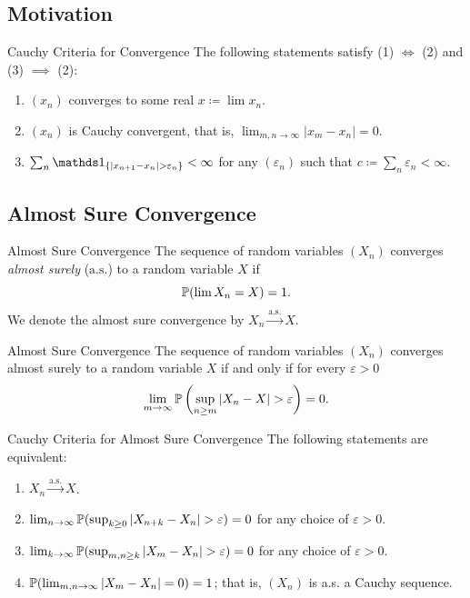 \subsection{Motivation}
\begin{prop}{Cauchy Criteria for Convergence}{}
	The following statements satisfy (1) \(\iff\) (2) and (3) \(\implies\) (2):
	\begin{enumerate}
		\item \((x_n)\) converges to some real \(x \coloneqq \lim x_n\).
		\item \((x_n)\) is Cauchy convergent, that is, \(\lim_{m,n \to \infty} |x_m - x_n| = 0\).
		\item \(\sum_n \I_{\{|x_{n+1} - x_n| > \varepsilon_n\}} < \infty\) for any \((\varepsilon_n)\) such that \(c \coloneqq \sum_n \varepsilon_n < \infty\).
	\end{enumerate}
\end{prop}

\subsection{Almost Sure Convergence}

\begin{defn}{Almost Sure Convergence}{}
	The sequence of random variables \((X_n)\) converges \textit{almost surely} (\(\text{a.s.}\)) to a random variable \(X\) if
	\begin{equation*}
		\mathbb{P}(\lim X_n = X) = 1.
	\end{equation*}
	We denote the almost sure convergence by \(X_n \xrightarrow{\text{a.s.}} X\).
\end{defn}

\begin{thm}{Almost Sure Convergence}{}
	The sequence of random variables \((X_n)\) converges almost surely to a random variable \(X\) if and only if for every \(\varepsilon > 0\)
	\begin{equation}
		\lim_{m \to \infty} \mathbb{P} \left( \sup_{n \ge m} |X_n - X| > \varepsilon \right) = 0.
		\label{eq:AlmostSureConvergenceCriteria}
	\end{equation}
\end{thm}

\begin{prop}{Cauchy Criteria for Almost Sure Convergence}{}
	The following statements are equivalent:
	\begin{enumerate}
		\item \(X_n \xrightarrow{\text{a.s.}} X\).
		\item \(\lim_{n \to \infty} \mathbb{P}(\sup_{k \ge 0} |X_{n+k} - X_n| > \varepsilon) = 0\) for any choice of \(\varepsilon > 0\).
		\item \(\lim_{k \to \infty} \mathbb{P}(\sup_{m, n \ge k} |X_m - X_n| > \varepsilon) = 0\) for any choice of \(\varepsilon > 0\).
		\item \(\mathbb{P}(\lim_{m, n \to \infty} |X_m - X_n| = 0) = 1\); that is, \((X_n)\) is a.s. a Cauchy sequence.
	\end{enumerate}
\end{prop}

